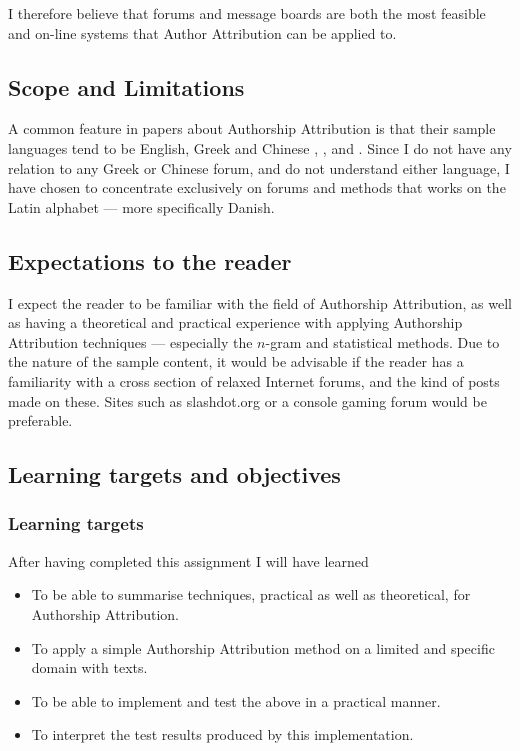 I therefore believe that forums and message boards are both the most feasible and on-line systems that Author Attribution can be applied to.

\subsection{Scope and Limitations}
\label{scope}
A common feature in papers about Authorship Attribution is that their sample languages tend to be English, Greek and Chinese \cite{syntactic}, \cite{nr2}, \cite{nr4} and \cite{app-spe}. Since I do not have any relation to any Greek or Chinese forum, and do not understand either language, I have chosen to concentrate exclusively on forums and methods that works on the Latin alphabet --- more specifically Danish.

\subsection{Expectations to the reader}
\label{expectations}
I expect the reader to be familiar with the field of Authorship Attribution, as well as having a theoretical and practical experience with applying Authorship Attribution techniques --- especially the $n$-gram and statistical methods. Due to the nature of the sample content, it would be advisable if the reader has a familiarity with a cross section of relaxed Internet forums, and the kind of posts made on these. Sites such as slashdot.org or a console gaming forum would be preferable.

\subsection{Learning targets and objectives}
\label{learning}
\subsubsection{Learning targets}
After having completed this assignment I will have learned 
\begin{itemize}
\item To be able to summarise techniques, practical as well as theoretical, for Authorship Attribution.
\item To apply a simple Authorship Attribution method on a limited and specific domain with texts.
\item To be able to implement and test the above in a practical manner.
\item To interpret the test results produced by this implementation.
\end{itemize}

